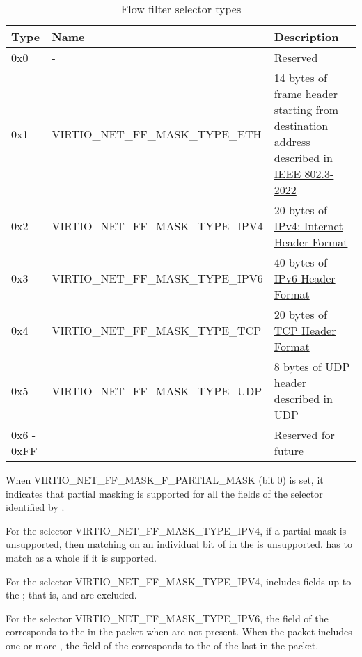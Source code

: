 \begin{table}[H]
\caption{Flow filter selector types}
\label{table:Device Types / Network Device / Device Operation / Flow filter / Device and driver capabilities / VIRTIO-NET-FF-SELECTOR-CAP / flow filter selector types}
\begin{tabularx}{\textwidth}{ |l|X|X| }
\hline
Type & Name & Description \\
\hline \hline
0x0 & - & Reserved \\
\hline
0x1 & VIRTIO_NET_FF_MASK_TYPE_ETH & 14 bytes of frame header starting from destination address described in \hyperref[intro:IEEE 802.3-2022]{IEEE 802.3-2022} \\
\hline
0x2 & VIRTIO_NET_FF_MASK_TYPE_IPV4 & 20 bytes of \hyperref[intro:Internet-Header-Format]{IPv4: Internet Header Format} \\
\hline
0x3 & VIRTIO_NET_FF_MASK_TYPE_IPV6 & 40 bytes of \hyperref[intro:IPv6-Header-Format]{IPv6 Header Format} \\
\hline
0x4 & VIRTIO_NET_FF_MASK_TYPE_TCP & 20 bytes of \hyperref[intro:TCP-Header-Format]{TCP Header Format} \\
\hline
0x5 & VIRTIO_NET_FF_MASK_TYPE_UDP & 8 bytes of UDP header described in \hyperref[intro:UDP]{UDP} \\
\hline
0x6 - 0xFF & & Reserved for future \\
\hline
\end{tabularx}
\end{table}

When VIRTIO_NET_FF_MASK_F_PARTIAL_MASK (bit 0) is set, it indicates that
partial masking is supported for all the fields of the selector identified by .

For the selector  VIRTIO_NET_FF_MASK_TYPE_IPV4, if a partial mask is unsupported,
then matching on an individual bit of  in the
 is unsupported.  has to match as a whole
if it is supported.

For the selector  VIRTIO_NET_FF_MASK_TYPE_IPV4,  includes fields
up to the ; that is,  and
 are excluded.

For the selector  VIRTIO_NET_FF_MASK_TYPE_IPV6, the  field
of the  corresponds to the  in the packet
when  are not present. When the packet includes
one or more , the  field of
the  corresponds to the  of the last
 in the packet.

